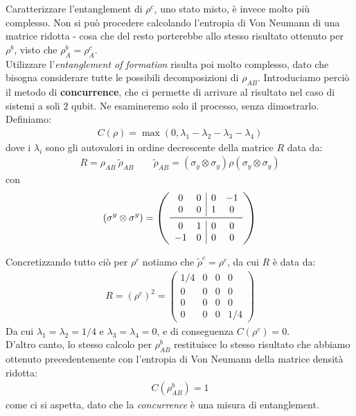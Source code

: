\documentclass[../../InformazioneQuantistica.tex]{subfiles}
\begin{document}
Caratterizzare l'entanglement di $\rho^c$, uno stato misto, è invece molto più complesso. Non si può procedere calcolando l'entropia di Von Neumann di una matrice ridotta - cosa che del resto porterebbe allo stesso risultato ottenuto per $\rho^b$, visto che $\rho_A^b = \rho_A^c$.\\
Utilizzare l'\textit{entanglement of formation} risulta poi molto complesso, dato che bisogna considerare tutte le possibili decomposizioni di $\rho_{AB}$. Introduciamo perciò il metodo di \textbf{concurrence}, che ci permette di arrivare al risultato nel caso di sistemi a soli $2$ qubit. Ne esamineremo solo il processo, senza dimostrarlo.\\
Definiamo:
\begin{align*}
C(\rho) = \max(0, \lambda_1 - \lambda_2 - \lambda_3 - \lambda_4)
\end{align*}
dove i $\lambda_i$ sono gli autovalori in ordine decrescente della matrice $R$ data da:
\begin{align*}
R = \rho_{AB}\>\tilde{\rho}_{AB} \qquad \tilde{\rho}_{AB} = (\sigma_y \otimes \sigma_y) \rho (\sigma_y \otimes \sigma_y)
\end{align*}
con
\begin{align*}
    (\sigma^y \otimes \sigma^y) = \left (
    \begin{array}{cc|cc}
        0 & 0 & 0 & -1\\
        0 & 0 & 1 & 0 \\ \midrule
        0 & 1 & 0 & 0\\
        -1 & 0 & 0 & 0
    \end{array}
    \right )
\end{align*}

Concretizzando tutto ciò per $\rho^c$ notiamo che $\tilde{\rho}^c = \rho^c$, da cui $R$ è data da:
\begin{align*}
R=(\rho^c)^2 = \left( \begin{array}{cc|cc}1/4 & 0 & 0 & 0 \\
0 & 0 & 0 & 0\\ \hline
0 & 0 & 0 & 0\\
0 & 0 & 0 & 1/4 \end{array}\right)
\end{align*}
Da cui $\lambda_1=\lambda_2=1/4$ e $\lambda_3=\lambda_4=0$, e di conseguenza $C(\rho^c)=0$.\\

D'altro canto, lo stesso calcolo per $\rho_{AB}^b$ restituisce lo stesso risultato che abbiamo ottenuto precedentemente con l'entropia di Von Neumann della matrice densità ridotta:
\begin{align*}
C(\rho_{AB}^b) = 1
\end{align*}
come ci si aspetta, dato che la \textit{concurrence} è una misura di entanglement.\\
\end{document}
